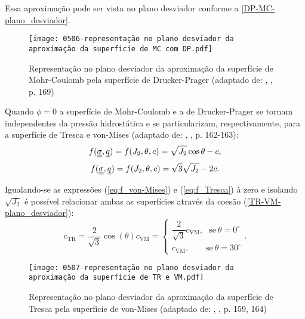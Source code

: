 Essa aproximação pode ser vista no plano desviador conforme a \autoref{DP-MC-plano_desviador}.
\begin{figure}[H]
	\begin{center}
		\texttt{[image: 0506-representação no plano desviador da aproximação da superficie de MC com DP.pdf]}
	\end{center}
	\caption{\label{DP-MC-plano_desviador}Representação no plano desviador da aproximação da superfície de Mohr-Coulomb pela superfície de Drucker-Prager  (adaptado de: \citeauthor{Neto2008}, \citeyear{Neto2008}, p. 169)}
\end{figure}
Quando $\phi = 0$ a superfície de Mohr-Coulomb e a de Drucker-Prager se tornam independentes da pressão hidrostática e se particularizam, respectivamente, para a superfície de Tresca e von-Mises (adaptado de: \citeauthor{Neto2008}, \citeyear{Neto2008}, p. 162-163):
\begin{equation}
	\label{eq:f_Tresca}
	f(\underline{\underline \sigma},\underline q) = f(J_2,\theta,c) = \sqrt{J_2}\cos{\theta} - c,
\end{equation}
\begin{equation}
	\label{eq:f_von-Mises}
	f(\underline{\underline \sigma},\underline q) = f(J_2,\theta,c) = \sqrt{3}\sqrt{J_2} - 2c.
\end{equation}

Igualando-se as expressões (\ref{eq:f_von-Mises}) e (\ref{eq:f_Tresca}) à zero e isolando $\sqrt{J_2}$ é possível relacionar ambas as superfícies através da coesão (\autoref{TR-VM-plano_desviador}):
\begin{equation}
	\label{eq:ctr_cvm}
	c_{\text{TR}} = \dfrac{2}{\sqrt{3}}\cos(\theta)c_{\text{VM}} = \left\{
	\begin{array}{lcl}
		\dfrac{2}{\sqrt{3}}c_{\text{VM}}, ~~~\text{se}~\theta = 0^\circ \\ 
		c_{\text{VM}},~~~~~~~~~\text{se}~\theta = 30^\circ
	\end{array}
	\right..
\end{equation}
\begin{figure}[H]
	\begin{center}
		\texttt{[image: 0507-representação no plano desviador da aproximação da superfície de TR e VM.pdf]}
	\end{center}
	\caption{\label{TR-VM-plano_desviador}Representação no plano desviador da aproximação da superfície de Tresca pela superfície de von-Mises (adaptado de: \citeauthor{Neto2008}, \citeyear{Neto2008}, p. 159, 164)}
\end{figure}

